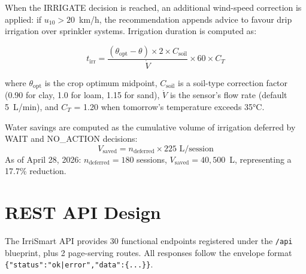 \documentclass[12pt,a4paper]{report}
\begin{document}
When the IRRIGATE decision is reached, an additional wind-speed correction is applied: if $u_{10} > 20$~km/h, the recommendation appends advice to favour drip irrigation over sprinkler systems. Irrigation duration is computed as:

\begin{equation}
  t_{\text{irr}} = \frac{(\theta_{\text{opt}} - \theta) \times 2 \times C_{\text{soil}}}{\dot{V}} \times 60 \times C_T
\end{equation}

where $\theta_{\text{opt}}$ is the crop optimum midpoint, $C_{\text{soil}}$ is a soil-type correction factor (0.90 for clay, 1.0 for loam, 1.15 for sand), $\dot{V}$ is the sensor's flow rate (default 5~L/min), and $C_T$ = 1.20 when tomorrow's temperature exceeds 35°C.

Water savings are computed as the cumulative volume of irrigation deferred by WAIT and NO\_ACTION decisions:
\begin{equation}
  V_{\text{saved}} = n_{\text{deferred}} \times 225\text{ L/session}
\end{equation}
As of April 28, 2026: $n_{\text{deferred}} = 180$ sessions, $V_{\text{saved}} = 40{,}500$~L, representing a 17.7\% reduction.



\section{REST API Design}

The IrriSmart API provides 30 functional endpoints registered under the \texttt{/api} blueprint, plus 2 page-serving routes. All responses follow the envelope format \texttt{\{"status":"ok|error","data":\{...\}\}}.
\end{document}
